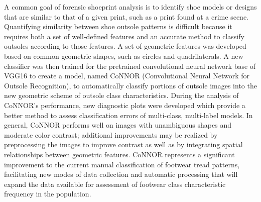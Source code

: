 
A common goal of forensic shoeprint analysis is to identify shoe models or designs that are similar to that of a given print, such as a print found at a crime scene. Quantifying similarity between shoe outsole patterns is difficult because it requires both a set of well-defined features and an accurate method to classify outsoles according to those features. A set of geometric features was developed based on common geometric shapes, such as circles and quadrilaterals. A new classifier was then trained for the pretrained convolutional neural network base of VGG16 to create a model, named CoNNOR (Convolutional Neural Network for Outsole Recognition), to automatically classify portions of outsole images into the new geometric scheme of outsole class characteristics. During the analysis of CoNNOR's performance, new diagnostic plots were developed which provide a better method to assess classification errors of multi-class, multi-label models. In general, CoNNOR performs well on images with unambiguous shapes and moderate color contrast; additional improvements may be realized by preprocessing the images to improve contrast as well as by integrating spatial relationships between geometric features. CoNNOR represents a significant improvement to the current manual classification of footwear tread patterns, facilitating new modes of data collection and automatic processing that will expand the data available for assessment of footwear class characteristic frequency in the population.
